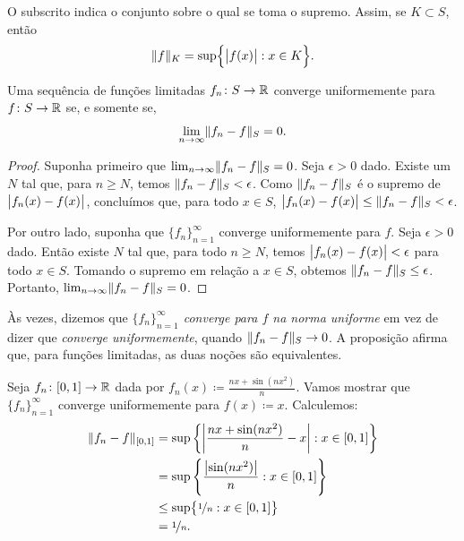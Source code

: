 O subscrito indica o conjunto sobre o qual se toma o supremo.
Assim, se $K \subset S$, então
\begin{equation*}
\lVert {f} \rVert_K =
\sup \Bigl\{ \bigl\lvert {f(x)} \bigr\rvert : x \in K \Bigr\} .
\end{equation*}

\begin{prop}
Uma sequência de funções limitadas $f_n \colon S \to {\mathbb{R}}$ converge
uniformemente para $f \colon S \to {\mathbb{R}}$ se, e somente se,
\begin{equation*}
\lim_{n\to\infty} \lVert {f_n - f} \rVert_S = 0 .
\end{equation*}
\end{prop}

\begin{proof}
Suponha primeiro que
$\lim_{n\to\infty} \lVert {f_n - f} \rVert_S = 0$. Seja $\epsilon > 0$ dado.
Existe um $N$ tal que, para $n \geq N$, temos
$\lVert {f_n - f} \rVert_S < \epsilon$. Como $\lVert {f_n-f} \rVert_S$ é o supremo de
$\bigl\lvert {f_n(x)-f(x)} \bigr\rvert$, concluímos que, para todo $x \in S$,
$\bigl\lvert {f_n(x)-f(x)} \bigr\rvert \leq \lVert {f_n - f} \rVert_S < \epsilon$.

Por outro lado, suponha que $\{ f_n \}_{n=1}^\infty$ converge
uniformemente para $f$. Seja $\epsilon > 0$ dado. Então existe $N$ tal
que, para todo $n \geq N$, temos $\bigl\lvert {f_n(x)-f(x)} \bigr\rvert < \epsilon$ para
todo $x \in S$. Tomando o supremo em relação a $x \in S$, obtemos
$\lVert {f_n - f} \rVert_S \leq \epsilon$. Portanto,
$\lim_{n\to\infty} \lVert {f_n-f} \rVert_S = 0$.
\end{proof}

Às vezes, dizemos que
\emph{$\{ f_n \}_{n=1}^\infty$ converge para $f$ na norma uniforme}%
em vez de dizer que \emph{converge uniformemente}, quando
$\lVert {f_n-f} \rVert_S \to 0$. A proposição afirma que, para funções limitadas,
as duas noções são equivalentes.

\begin{example}
Seja $f_n \colon [0,1] \to {\mathbb{R}}$ dada por
$f_n(x) \coloneqq \frac{nx+ \sin(nx^2)}{n}$.
Vamos mostrar que $\{ f_n \}_{n=1}^\infty$ converge uniformemente para
$f(x) \coloneqq x$. Calculemos:
\begin{equation*}
\begin{split}
\lVert {f_n-f} \rVert_{[0,1]}
& =
\sup \left\{ \left\lvert {\frac{nx+ \sin(nx^2)}{n} - x} \right\rvert : x \in [0,1] \right\}
\\
& =
\sup \left\{ \frac{\bigl\lvert {\sin(nx^2)} \bigr\rvert}{n} : x \in [0,1] \right\}
\\
& \leq
\sup \bigl\{ \nicefrac{1}{n} : x \in [0,1] \bigr\}
\\
& = \nicefrac{1}{n}.
\end{split}
\end{equation*}
\end{example}

